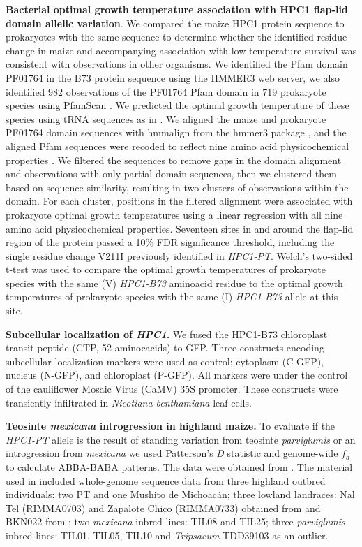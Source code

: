\documentclass[9pt,twocolumn,twoside,lineno]{biorxiv}
\begin{document}
\textbf{Bacterial optimal growth temperature association with HPC1 flap-lid domain allelic variation}.
We compared the maize HPC1 protein sequence to prokaryotes with the same sequence to determine whether the identified residue change in maize and accompanying association with low temperature survival was consistent with observations in other organisms. 
We identified the Pfam domain PF01764 in the B73 protein sequence using the HMMER3 web server, we also identified 982 observations of the PF01764 Pfam domain in 719 prokaryote species using PfamScan \cite{Potter2018-tk, El-Gebali2019-pw}. 
We predicted the optimal growth temperature of these species using tRNA sequences as in \cite{Cimen2020-dm}. 
We aligned the maize and prokaryote PF01764 domain sequences with hmmalign from the hmmer3 package \cite{Eddy2011-pd}, and the aligned Pfam sequences were recoded to reflect nine amino acid physicochemical properties \cite{Li2016-ut}. 
We filtered the sequences to remove gaps in the domain alignment and observations with only partial domain sequences, then we clustered them based on sequence similarity, resulting in two clusters of observations within the domain. 
For each cluster, positions in the filtered alignment were associated with prokaryote optimal growth temperatures using a linear regression with all nine amino acid physicochemical properties. 
Seventeen sites in and around the flap-lid region of the protein passed a 10\% FDR significance threshold, including the single residue change V211I previously identified in \textit{HPC1-PT}. 
Welch’s two-sided t-test was used to compare the optimal growth temperatures of prokaryote species with the same (V) \textit{HPC1-B73} aminoacid residue to the optimal growth temperatures of prokaryote species with the same (I) \textit{HPC1-B73} allele at this site.

\textbf{Subcellular localization of \textit{HPC1}.}
We fused the HPC1-B73 chloroplast transit peptide (CTP, 52 aminocacids) to GFP. 
Three constructs encoding subcellular localization markers were used as control; cytoplasm (C-GFP), nucleus (N-GFP), and chloroplast (P-GFP).
All markers were under the control of the cauliflower Mosaic Virus (CaMV) 35S promoter. 
These constructs were transiently infiltrated in \textit{Nicotiana benthamiana} leaf cells.

\textbf{Teosinte \textit{mexicana} introgression in highland maize.}
To evaluate if the \textit{HPC1-PT} allele is the result of standing variation from teosinte \textit{parviglumis} or an introgression from \textit{mexicana} we used Patterson's \textit{D} statistic and genome-wide $f_{d}$ to calculate ABBA-BABA patterns. 
The data were obtained from \cite{Gonzalez-Segovia2019-jy}. 
The material used in \cite{Gonzalez-Segovia2019-jy} included whole-genome sequence data from three highland outbred individuals: two PT and one Mushito de Michoacán; three lowland landraces: Nal Tel (RIMMA0703) and Zapalote Chico (RIMMA0733) obtained from \cite{Wang2017-bc} and  BKN022 from \cite{Bukowski2017-ng}; two \textit{mexicana} inbred lines: TIL08 and TIL25; three \textit{parviglumis} inbred lines: TIL01, TIL05, TIL10 and \textit{Tripsacum} TDD39103 \cite{Bukowski2017-ng} as an outlier. 
\end{document}
